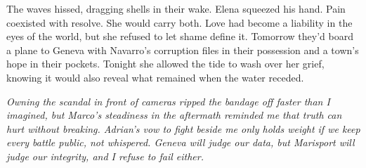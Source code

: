 The waves hissed, dragging shells in their wake. Elena squeezed his hand. Pain coexisted with resolve. She would carry both. Love had become a liability in the eyes of the world, but she refused to let shame define it. Tomorrow they'd board a plane to Geneva with Navarro's corruption files in their possession and a town's hope in their pockets. Tonight she allowed the tide to wash over her grief, knowing it would also reveal what remained when the water receded.


\noindent\textit{Owning the scandal in front of cameras ripped the bandage off faster than I imagined, but Marco's steadiness in the aftermath reminded me that truth can hurt without breaking. Adrian's vow to fight beside me only holds weight if we keep every battle public, not whispered. Geneva will judge our data, but Marisport will judge our integrity, and I refuse to fail either.}
